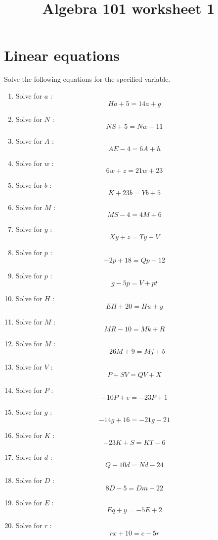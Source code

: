 \documentclass{article}
\begin{document}
    \title{Algebra 101 worksheet 1} 
 \date{\vspace{-5ex}} 
 \maketitle

        \section{Linear equations}
        Solve the following equations for the specified variable.
        \begin{multicols}{1}
        \begin{enumerate}
        \item Solve for $a$ : $$H a + 5 = 14 a + g$$
\item Solve for $N$ : $$N S + 5 = N w - 11$$
\item Solve for $A$ : $$A E - 4 = 6 A + h$$
\item Solve for $w$ : $$6 w + z = 21 w + 23$$
\item Solve for $b$ : $$K + 23 b = Y b + 5$$
\item Solve for $M$ : $$M S - 4 = 4 M + 6$$
\item Solve for $y$ : $$X y + z = T y + V$$
\item Solve for $p$ : $$- 2 p + 18 = Q p + 12$$
\item Solve for $p$ : $$g - 5 p = V + p t$$
\item Solve for $H$ : $$E H + 20 = H u + y$$
\item Solve for $M$ : $$M R - 10 = M k + R$$
\item Solve for $M$ : $$- 26 M + 9 = M j + b$$
\item Solve for $V$ : $$P + S V = Q V + X$$
\item Solve for $P$ : $$- 10 P + e = - 23 P + 1$$
\item Solve for $g$ : $$- 14 g + 16 = - 21 g - 21$$
\item Solve for $K$ : $$- 23 K + S = K T - 6$$
\item Solve for $d$ : $$Q - 10 d = N d - 24$$
\item Solve for $D$ : $$8 D - 5 = D m + 22$$
\item Solve for $E$ : $$E q + y = - 5 E + 2$$
\item Solve for $r$ : $$r x + 10 = c - 5 r$$
        \end{enumerate}
        \end{multicols}
        
\end{document}
